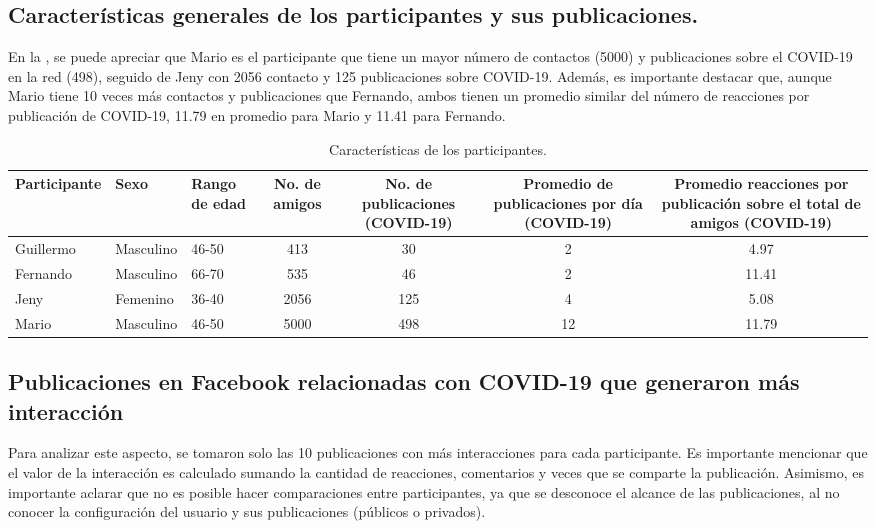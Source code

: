 \documentclass{textolivre}
\begin{document}
\subsection{Características generales de los participantes y sus publicaciones.}

En la , se puede apreciar que Mario es el participante que tiene un mayor número de contactos (5000) y publicaciones sobre el COVID-19 en la red (498), seguido de Jeny con 2056 contacto y 125 publicaciones sobre COVID-19. Además, es importante destacar que, aunque Mario tiene 10 veces más contactos y publicaciones que Fernando, ambos tienen un promedio similar del número de reacciones por publicación de COVID-19, 11.79 en promedio para Mario y 11.41 para Fernando. 


%
%
\begin{table}[htpb]
\caption{Características de los participantes.}
\label{tab03}
\small
\centering
\begin{tabular}{lllcccc}
\toprule 
Participante &
Sexo &
\multicolumn{1}{p{1cm}}{\centering Rango de edad} &
\multicolumn{1}{p{1cm}}{\centering No. de amigos} &
\multicolumn{1}{p{1.5cm}}{\centering No. de publicaciones (COVID-19)} &
\multicolumn{1}{p{1.75cm}}{\centering Promedio de publicaciones por día (COVID-19)} &
\multicolumn{1}{p{2cm}}{\centering Promedio reacciones por publicación sobre el total de amigos (COVID-19)} \\
\midrule 
Guillermo & Masculino & 46-50 & 413 & 30 & 2 & 4.97 \\
Fernando & Masculino & 66-70 & 535 & 46 & 2 & 11.41 \\
Jeny & Femenino & 36-40 & 2056 & 125 & 4 & 5.08 \\
Mario & Masculino & 46-50 & 5000 & 498 & 12 & 11.79 \\
\bottomrule
\end{tabular}
\end{table}

\subsection{Publicaciones en Facebook relacionadas con COVID-19 que generaron más interacción}

Para analizar este aspecto, se tomaron solo las 10 publicaciones con más interacciones para cada participante. Es importante mencionar que el valor de la interacción es calculado sumando la cantidad de reacciones, comentarios y veces que se comparte la publicación. Asimismo, es importante aclarar que no es posible hacer comparaciones entre participantes, ya que se desconoce el alcance de las publicaciones, al no conocer la configuración del usuario y sus publicaciones (públicos o privados).
\end{document}
